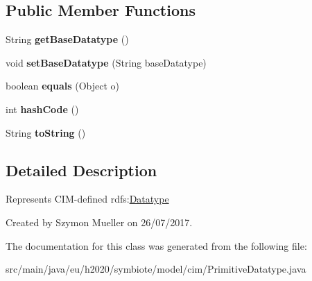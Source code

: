 \subsection*{Public Member Functions}
\begin{DoxyCompactItemize}
\item 
\mbox{\label{classeu_1_1h2020_1_1symbiote_1_1model_1_1cim_1_1PrimitiveDatatype_a1b832eab011aff6f7ae273ee2aca9de3}} 
String {\bfseries get\+Base\+Datatype} ()
\item 
\mbox{\label{classeu_1_1h2020_1_1symbiote_1_1model_1_1cim_1_1PrimitiveDatatype_aadfb46dcbc39c4150c86dc719606d3f9}} 
void {\bfseries set\+Base\+Datatype} (String base\+Datatype)
\item 
\mbox{\label{classeu_1_1h2020_1_1symbiote_1_1model_1_1cim_1_1PrimitiveDatatype_aa4f931d01085f91592edcb7d5d32d7ab}} 
boolean {\bfseries equals} (Object o)
\item 
\mbox{\label{classeu_1_1h2020_1_1symbiote_1_1model_1_1cim_1_1PrimitiveDatatype_a226688d81a0c0dd565e0dba3399c3851}} 
int {\bfseries hash\+Code} ()
\item 
\mbox{\label{classeu_1_1h2020_1_1symbiote_1_1model_1_1cim_1_1PrimitiveDatatype_a6ff72c772e92237eb3f6f11dc9ba9df2}} 
String {\bfseries to\+String} ()
\end{DoxyCompactItemize}


\subsection{Detailed Description}
Represents C\+I\+M-\/defined rdfs\+:\hyperlink{classeu_1_1h2020_1_1symbiote_1_1model_1_1cim_1_1Datatype}{Datatype}

Created by Szymon Mueller on 26/07/2017. 

The documentation for this class was generated from the following file\+:\begin{DoxyCompactItemize}
\item 
src/main/java/eu/h2020/symbiote/model/cim/Primitive\+Datatype.\+java\end{DoxyCompactItemize}
